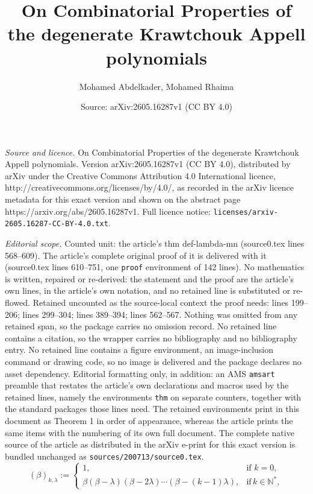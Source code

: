 \documentclass[10pt,a4paper]{amsart}
\title{On Combinatorial Properties of the degenerate Krawtchouk Appell polynomials}
\author{Mohamed Abdelkader, Mohamed Rhaima}
\date{Source: arXiv:2605.16287v1 (CC BY 4.0)}
\begin{document}
\maketitle

\noindent\emph{Source and licence.} On Combinatorial Properties of the degenerate Krawtchouk Appell polynomials. Version arXiv:2605.16287v1 (CC BY 4.0), distributed by arXiv under the Creative Commons Attribution 4.0 International licence, http://creativecommons.org/licenses/by/4.0/, as recorded in the arXiv licence metadata for this exact version and shown on the abstract page https://arxiv.org/abs/2605.16287v1. Full licence notice: \texttt{licenses/arxiv-2605.16287-CC-BY-4.0.txt}.\par\smallskip

\noindent\textit{Editorial scope.} Counted unit: the article's thm def-lambda-mn (source0.tex lines 568--609). The article's complete original proof of it is delivered with it (source0.tex lines 610--751, one \texttt{proof} environment of 142 lines). No mathematics is written, repaired or re-derived: the statement and the proof are the article's own lines, in the article's own notation, and no retained line is substituted or re-flowed.  Retained uncounted as the source-local context the proof needs: lines 199--206; lines 299--304; lines 389--394; lines 562--567.  Nothing was omitted from any retained span, so the package carries no omission record.  No retained line contains a citation, so the wrapper carries no bibliography and no bibliography entry.  No retained line contains a figure environment, an image-inclusion command or drawing code, so no image is delivered and the package declares no asset dependency.  Editorial formatting only, in addition: an AMS \texttt{amsart} preamble that restates the article's own declarations and macros used by the retained lines, namely the environments \texttt{thm} on separate counters, together with the standard packages those lines need.  The retained environments print in this document as Theorem 1 in order of appearance, whereas the article prints the same items with the numbering of its own full document.  The complete native source of the article as distributed in the arXiv e-print for this exact version is bundled unchanged as \texttt{sources/200713/source0.tex}.
\begin{equation}\label{Degenerate-falling}
(\beta)_{k,\lambda}:=
\begin{cases}
1, & \text{if } k=0, \\
\beta(\beta- \lambda)(\beta- 2\lambda)\cdots (\beta-(k-1)\lambda), &
\text{if}\, k \in \mathbb{N}^{\ast},
\end{cases}
\end{equation}
\end{document}
